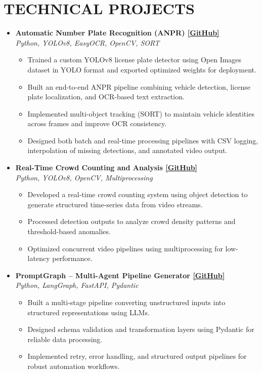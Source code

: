 \documentclass[11pt,letterpaper]{article}
\begin{document}
\section{TECHNICAL PROJECTS}
\begin{itemize}[leftmargin=*]

\item \textbf{Automatic Number Plate Recognition (ANPR) 
\href{https://github.com/nvmaditya/ANPR}{[GitHub]}} \\
\textit{\small Python, YOLOv8, EasyOCR, OpenCV, SORT}
\begin{itemize}[leftmargin=*]
    \item Trained a custom YOLOv8 license plate detector using Open Images dataset in YOLO format and exported optimized weights for deployment.
    \item Built an end-to-end ANPR pipeline combining vehicle detection, license plate localization, and OCR-based text extraction.
    \item Implemented multi-object tracking (SORT) to maintain vehicle identities across frames and improve OCR consistency.
    \item Designed both batch and real-time processing pipelines with CSV logging, interpolation of missing detections, and annotated video output.
\end{itemize}

\item \textbf{Real-Time Crowd Counting and Analysis 
\href{https://github.com/nvmaditya/CrowdCount}{[GitHub]}} \\
\textit{\small Python, YOLOv8, OpenCV, Multiprocessing}
\begin{itemize}[leftmargin=*]
    \item Developed a real-time crowd counting system using object detection to generate structured time-series data from video streams.
    \item Processed detection outputs to analyze crowd density patterns and threshold-based anomalies.
    \item Optimized concurrent video pipelines using multiprocessing for low-latency performance.
\end{itemize}

\item \textbf{PromptGraph -- Multi-Agent Pipeline Generator 
\href{https://github.com/nvmaditya/PromptGraph}{[GitHub]}} \\
\textit{\small Python, LangGraph, FastAPI, Pydantic}
\begin{itemize}[leftmargin=*]
    \item Built a multi-stage pipeline converting unstructured inputs into structured representations using LLMs.
    \item Designed schema validation and transformation layers using Pydantic for reliable data processing.
    \item Implemented retry, error handling, and structured output pipelines for robust automation workflows.
\end{itemize}

\end{itemize}
\end{document}
